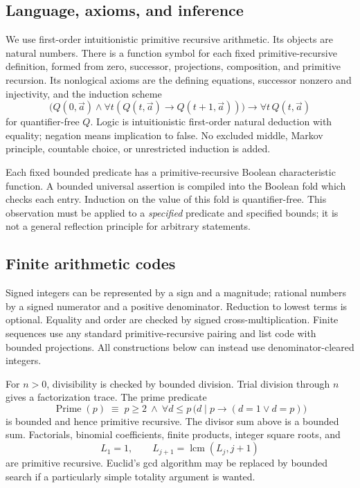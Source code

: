 \documentclass[11pt,a4paper]{article}
\theoremstyle{definition}
\begin{document}
\subsection{Language, axioms, and inference}

We use first-order intuitionistic primitive recursive arithmetic. Its
objects are natural numbers. There is a function symbol for each fixed
primitive-recursive definition, formed from zero, successor, projections,
composition, and primitive recursion. Its nonlogical axioms are the
defining equations, successor nonzero and injectivity, and the induction
scheme
\[
 \bigl(Q(0,\vec a)\wedge
 \forall t(Q(t,\vec a)\to Q(t+1,\vec a))\bigr)
 \to\forall t\,Q(t,\vec a)
\]
for quantifier-free $Q$. Logic is intuitionistic first-order natural
deduction with equality; negation means implication to false. No excluded
middle, Markov principle, countable choice, or unrestricted induction is
added.

Each fixed bounded predicate has a primitive-recursive Boolean
characteristic function. A bounded universal assertion is compiled into
the Boolean fold which checks each entry. Induction on the value of this
fold is quantifier-free. This observation must be applied to a
\emph{specified} predicate and specified bounds; it is not a general
reflection principle for arbitrary statements.

\subsection{Finite arithmetic codes}

Signed integers can be represented by a sign and a magnitude; rational
numbers by a signed numerator and a positive denominator. Reduction to
lowest terms is optional. Equality and order are checked by signed
cross-multiplication. Finite sequences use any standard primitive-recursive
pairing and list code with bounded projections. All constructions below
can instead use denominator-cleared integers.

For $n>0$, divisibility is checked by bounded division. Trial division
through $n$ gives a factorization trace. The prime predicate
\[
 \operatorname{Prime}(p)\;\equiv\;
 p\ge2\ \wedge\
 \forall d\le p\,\bigl(d\mid p\to(d=1\vee d=p)\bigr)
\]
is bounded and hence primitive recursive. The divisor sum above is a
bounded sum. Factorials, binomial coefficients, finite products, integer
square roots, and
\[
 L_1=1,\qquad L_{j+1}=\operatorname{lcm}(L_j,j+1)
\]
are primitive recursive. Euclid's gcd algorithm may be replaced by
bounded search if a particularly simple totality argument is wanted.
\end{document}
